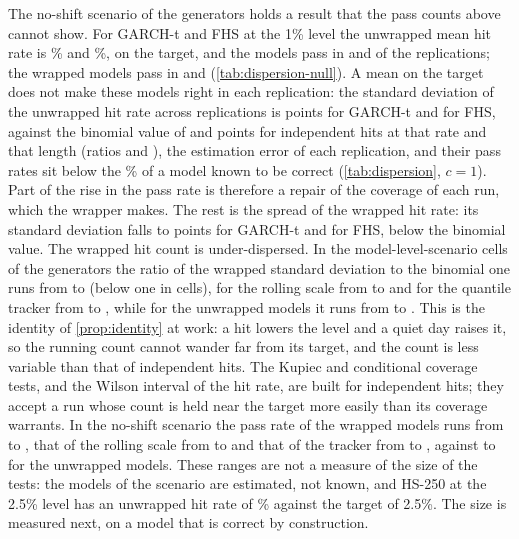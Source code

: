 The no-shift scenario of the generators holds a result that the pass counts above cannot show. For GARCH-t and FHS at the 1\% level the unwrapped mean hit rate is \genHitNullGarchTOneUnw\% and \genHitNullFhsOneUnw\%, on the target, and the models pass in \genPassNullGarchTOneUnw{} and \genPassNullFhsOneUnw{} of the replications; the wrapped models pass in \genPassNullGarchTOneAci{} and \genPassNullFhsOneAci{} (\cref{tab:dispersion-null}). A mean on the target does not make these models right in each replication: the standard deviation of the unwrapped hit rate across replications is \dispSdNullGarchTOneUnw{} points for GARCH-t and \dispSdNullFhsOneUnw{} for FHS, against the binomial value of \dispBinNullGarchTOneUnw{} and \dispBinNullFhsOneUnw{} points for independent hits at that rate and that length (ratios \dispRatioNullGarchTOneUnw{} and \dispRatioNullFhsOneUnw{}), the estimation error of each replication, and their pass rates sit below the \dispBOneOneUnwPass\% of a model known to be correct (\cref{tab:dispersion}, $c = 1$). Part of the rise in the pass rate is therefore a repair of the coverage of each run, which the wrapper makes. The rest is the spread of the wrapped hit rate: its standard deviation falls to \dispSdNullGarchTOneAci{} points for GARCH-t and \dispSdNullFhsOneAci{} for FHS, below the binomial value. The wrapped hit count is under-dispersed. In the \dispRatioAciN{} model-level-scenario cells of the generators the ratio of the wrapped standard deviation to the binomial one runs from \dispRatioAciMin{} to \dispRatioAciMax{} (below one in \dispRatioAciBelow{} cells), for the rolling scale from \dispRatioRollMin{} to \dispRatioRollMax{} and for the quantile tracker from \dispRatioTrkMin{} to \dispRatioTrkMax{}, while for the unwrapped models it runs from \dispRatioUnwMin{} to \dispRatioUnwMax{}. This is the identity of \cref{prop:identity} at work: a hit lowers the level and a quiet day raises it, so the running count cannot wander far from its target, and the count is less variable than that of independent hits. The Kupiec and conditional coverage tests, and the Wilson interval of the hit rate, are built for independent hits; they accept a run whose count is held near the target more easily than its coverage warrants. In the no-shift scenario the pass rate of the wrapped models runs from \dispNullPassAciMin{} to \dispNullPassAciMax{}, that of the rolling scale from \dispNullPassRollMin{} to \dispNullPassRollMax{} and that of the tracker from \dispNullPassTrkMin{} to \dispNullPassTrkMax{}, against \dispNullPassUnwMin{} to \dispNullPassUnwMax{} for the unwrapped models. These ranges are not a measure of the size of the tests: the models of the scenario are estimated, not known, and HS-250 at the 2.5\% level has an unwrapped hit rate of \genHitNullHsTwoFiftyTwoHalfUnw\% against the target of 2.5\%. The size is measured next, on a model that is correct by construction.

